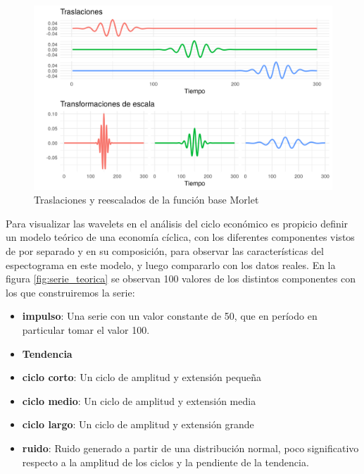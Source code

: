 \documentclass[a4paper]{article}
\begin{document}
\begin{figure}[H]
	\centering
	\includegraphics[width=\linewidth]{morelt.png}
	\caption{Traslaciones y reescalados de la función base Morlet} \label{fig:morlet}
\end{figure}

Para visualizar las wavelets en el análisis del ciclo económico es propicio definir un modelo teórico de una economía cíclica, con los diferentes componentes vistos de por separado y en su composición, para observar las características del espectograma en este modelo,  y luego compararlo con los datos reales. 
En la figura \ref{fig:serie_teorica} se observan 100 valores de los distintos componentes con los que construiremos la serie:

\begin{itemize}
	\item \textbf{impulso}: Una serie con un valor constante de 50, que en período en particular tomar el valor 100.
	\item \textbf{Tendencia}
	\item \textbf{ciclo corto}: Un ciclo de amplitud y extensión pequeña
	\item \textbf{ciclo medio}: Un ciclo de amplitud y extensión media
	\item \textbf{ciclo largo}: Un ciclo de amplitud y extensión grande
	\item \textbf{ruido}: Ruido generado a partir de una distribución normal, poco significativo respecto a la amplitud de los ciclos y la pendiente de la tendencia.
\end{itemize}
\end{document}
